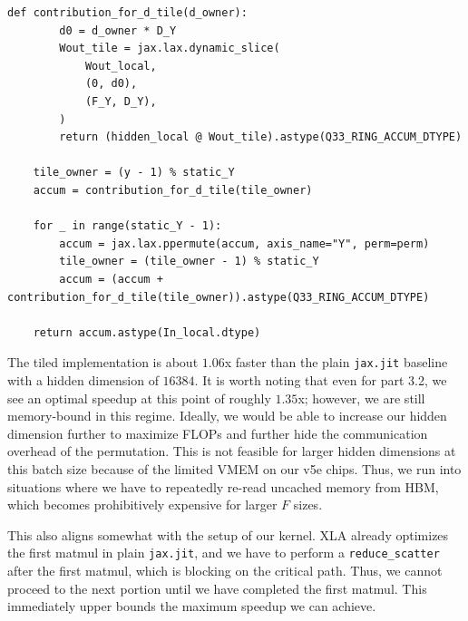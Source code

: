 \documentclass[11pt]{article}
\begin{document}
\begin{enumerate}
\begin{lstlisting}[style=pythoncode]
    def contribution_for_d_tile(d_owner):
        d0 = d_owner * D_Y
        Wout_tile = jax.lax.dynamic_slice(
            Wout_local,
            (0, d0),
            (F_Y, D_Y),
        )
        return (hidden_local @ Wout_tile).astype(Q33_RING_ACCUM_DTYPE)

    tile_owner = (y - 1) % static_Y
    accum = contribution_for_d_tile(tile_owner)

    for _ in range(static_Y - 1):
        accum = jax.lax.ppermute(accum, axis_name="Y", perm=perm)
        tile_owner = (tile_owner - 1) % static_Y
        accum = (accum + contribution_for_d_tile(tile_owner)).astype(Q33_RING_ACCUM_DTYPE)

    return accum.astype(In_local.dtype)
\end{lstlisting}

The tiled implementation is about $1.06$x faster than the plain
\texttt{jax.jit} baseline with a hidden dimension of $16384$. It is worth
noting that even for part 3.2, we see an optimal speedup at this point of
roughly $1.35$x; however, we are still memory-bound in this regime.
Ideally, we would be able to increase our hidden dimension further to
maximize FLOPs and further hide the communication overhead of the
permutation. This is not feasible for larger hidden dimensions at this batch
size because of the limited VMEM on our v5e chips. Thus, we run into
situations where we have to repeatedly re-read uncached memory from HBM,
which becomes prohibitively expensive for larger $F$ sizes.

This also aligns somewhat with the setup of our kernel. XLA already
optimizes the first matmul in plain \texttt{jax.jit}, and we have to perform
a \texttt{reduce\_scatter} after the first matmul, which is blocking on the
critical path. Thus, we cannot proceed to the next portion until we have
completed the first matmul. This immediately upper bounds the maximum
speedup we can achieve.

\end{enumerate}

\clearpage
\end{document}
